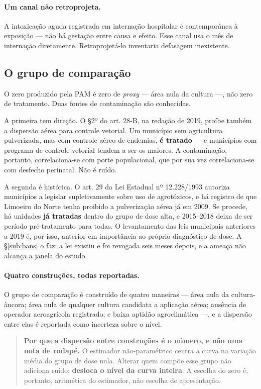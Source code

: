 \paragraph{Um canal não retroprojeta.} A intoxicação aguda registrada em
internação hospitalar é contemporânea à exposição --- não há gestação entre causa
e efeito. Esse canal usa o mês de internação diretamente. Retroprojetá-lo
inventaria defasagem inexistente.

\subsection{O grupo de comparação}
\label{sub:zero}

O zero produzido pela PAM é zero de \emph{proxy} --- área nula da cultura ---, não
zero de tratamento. Duas fontes de contaminação são conhecidas.

A primeira tem direção. O §2º do art. 28-B, na redação de 2019, proíbe também a
dispersão aérea para controle vetorial. Um município sem agricultura pulverizada,
mas com controle aéreo de endemias, \textbf{é tratado} --- e municípios com
programa de controle vetorial tendem a ser os maiores. A contaminação, portanto,
correlaciona-se com porte populacional, que por sua vez correlaciona-se com
desfecho perinatal. Não é ruído.

A segunda é histórica. O art. 29 da Lei Estadual nº 12.228/1993 autoriza
municípios a legislar supletivamente sobre uso de agrotóxicos, e há registro de
que Limoeiro do Norte tenha proibido a pulverização aérea já em 2009. Se procede,
há unidades \textbf{já tratadas} dentro do grupo de dose alta, e 2015--2018 deixa
de ser período pré-tratamento para todas. O levantamento das leis municipais
anteriores a 2019 é, por isso, anterior em importância ao próprio diagnóstico de
dose. A §\ref{sub:bans} o faz: a lei existiu e foi revogada seis meses depois,
e a ameaça não alcança a janela do estudo.

\paragraph{Quatro construções, todas reportadas.} O grupo de comparação é
construído de quatro maneiras --- área nula da cultura-âncora; área nula de
qualquer cultura candidata a aplicação aérea; ausência de operador aeroagrícola
registrado; e baixa aptidão agroclimática ---, e a dispersão entre elas é
reportada como incerteza sobre o nível.

\begin{quote}
\textbf{Por que a dispersão entre construções é o número, e não uma nota de
rodapé.} O estimador não-paramétrico centra a curva na variação média do grupo de
dose nula. Alterar quem compõe esse grupo não adiciona ruído: \textbf{desloca o
nível da curva inteira}. A escolha do zero é, portanto, aritmética do estimador,
não escolha de apresentação.
\end{quote}

